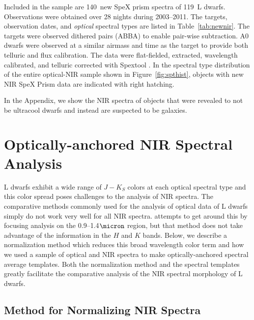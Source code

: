 \documentclass[12pt,preprint]{aastex}
\newcommand{\NewPrismSpectra}{140} %
\newcommand{\NewPrismObjects}{119} %
\begin{document}
Included in the sample are \NewPrismSpectra~new SpeX prism spectra of \NewPrismObjects~L dwarfs. 
Observations were obtained over 28 nights during 2003--2011. The targets, observation dates, and \emph{optical} spectral types are listed in Table~\ref{tab:newnir}. 
The targets were observed dithered pairs (ABBA) to enable pair-wise subtraction. A0 dwarfs were observed at a similar airmass and time as the target to provide both telluric and flux calibration.
The data were flat-fielded, extracted, wavelength calibrated, and telluric corrected with Spextool \citep{Cushing04,Spextool2}.
In the spectral type distribution of the entire optical-NIR sample shown in Figure~\ref{fig:spthist}, objects with new NIR SpeX Prism data are indicated with right hatching.

In the Appendix, we show the NIR spectra of objects that were revealed to not be ultracool dwarfs and instead are suspected to be galaxies.

\clearpage
\section{Optically-anchored NIR Spectral Analysis}

L dwarfs exhibit a wide range of $J-K_S$ colors at each optical spectral type \cite[e.g.,][]{Kirkpatrick08, Schmidt10, Faherty:2012cy} and this color spread poses challenges to the analysis of NIR spectra. 
The comparative methods commonly used for the analysis of optical data of L dwarfs simply do not work very well for all NIR spectra.
\citet{Kirkpatrick10} attempts to get around this by focusing analysis on the 0.9--1.4$\micron$ region, but that method does not take advantage of the information in the $H$ and $K$ bands.
Below, we describe a normalization method which reduces this broad wavelength color term and how we used a sample of optical and NIR spectra to make optically-anchored spectral average templates. 
Both the normalization method and the spectral templates greatly facilitate the comparative analysis of the NIR spectral morphology of L dwarfs.

\subsection{Method for Normalizing NIR Spectra}
\label{sec:method}
\end{document}

